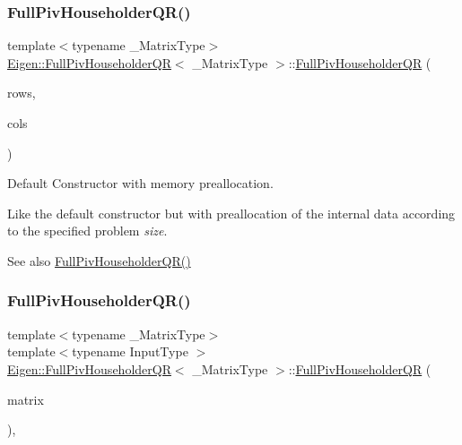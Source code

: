 \subsubsection{\texorpdfstring{FullPivHouseholderQR()}{FullPivHouseholderQR()}\hspace{0.1cm}{\footnotesize\ttfamily [2/4]}}
{\footnotesize\ttfamily template$<$typename \+\_\+\+Matrix\+Type$>$ \\
\mbox{\hyperlink{class_eigen_1_1_full_piv_householder_q_r}{Eigen\+::\+Full\+Piv\+Householder\+QR}}$<$ \+\_\+\+Matrix\+Type $>$\+::\mbox{\hyperlink{class_eigen_1_1_full_piv_householder_q_r}{Full\+Piv\+Householder\+QR}} (\begin{DoxyParamCaption}\item[{Index}]{rows,  }\item[{Index}]{cols }\end{DoxyParamCaption})\hspace{0.3cm}{\ttfamily [inline]}}



Default Constructor with memory preallocation. 

Like the default constructor but with preallocation of the internal data according to the specified problem {\itshape size}. \begin{DoxySeeAlso}{See also}
\mbox{\hyperlink{class_eigen_1_1_full_piv_householder_q_r_aeb14b4c1eef33128207b40a00bd0bd08}{Full\+Piv\+Householder\+Q\+R()}} 
\end{DoxySeeAlso}
\mbox{\label{class_eigen_1_1_full_piv_householder_q_r_aeeace3abca6b215025e94c3e098b0a97}} 
\subsubsection{\texorpdfstring{FullPivHouseholderQR()}{FullPivHouseholderQR()}\hspace{0.1cm}{\footnotesize\ttfamily [3/4]}}
{\footnotesize\ttfamily template$<$typename \+\_\+\+Matrix\+Type$>$ \\
template$<$typename Input\+Type $>$ \\
\mbox{\hyperlink{class_eigen_1_1_full_piv_householder_q_r}{Eigen\+::\+Full\+Piv\+Householder\+QR}}$<$ \+\_\+\+Matrix\+Type $>$\+::\mbox{\hyperlink{class_eigen_1_1_full_piv_householder_q_r}{Full\+Piv\+Householder\+QR}} (\begin{DoxyParamCaption}\item[{const \mbox{\hyperlink{struct_eigen_1_1_eigen_base}{Eigen\+Base}}$<$ Input\+Type $>$ \&}]{matrix }\end{DoxyParamCaption})\hspace{0.3cm}{\ttfamily [inline]}, {\ttfamily [explicit]}}



